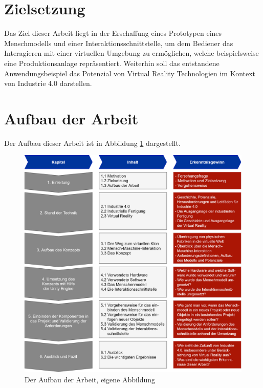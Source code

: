 \section{Zielsetzung}\label{sec:Zielsetzung}
Das Ziel dieser Arbeit liegt in der Erschaffung eines Prototypen eines Menschmodells und einer Interaktionsschnittstelle, um dem Bediener das Interagieren mit einer virtuellen Umgebung zu ermöglichen, welche beispielsweise eine Produktionsanlage repräsentiert. Weiterhin soll das entstandene Anwendungsbeispiel das Potenzial von Virtual Reality Technologien im Kontext von Industrie 4.0 darstellen.
\newpage

\section{Aufbau der Arbeit}\label{sec:AufbauDerArbeit}
Der Aufbau dieser Arbeit ist in Abbildung \ref{fig:AufbauDerArbeit} dargestellt.
\begin{figure}[h]
	\centering
	\includegraphics[width=1\linewidth]{Bilder/A55_AufbauNeu}
	\caption{Der Aufbau der Arbeit, eigene Abbildung}
	\label{fig:AufbauDerArbeit}
\end{figure}
